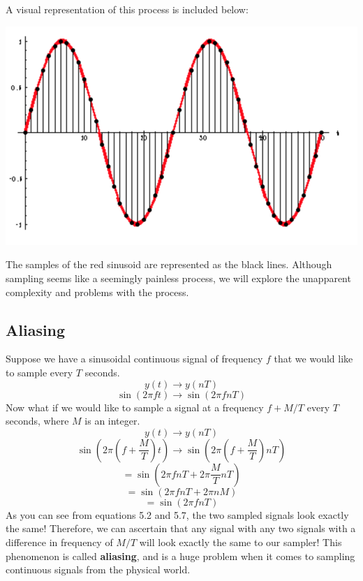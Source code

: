 \documentclass[a4paper]{article}
\numberwithin{equation}{section}
\begin{document}
A visual representation of this process is included below:
\begin{center}
\includegraphics[scale=0.7]{example_sample.png}
\end{center}
The samples of the red sinusoid are represented as the black lines.
Although sampling seems like a seemingly painless process, we will explore the unapparent complexity and problems with the process.

\subsection{Aliasing}
Suppose we have a sinusoidal continuous signal of frequency $f$ that we would like to sample every $T$ seconds. 
\begin{equation}
y(t) \rightarrow y(nT)
\end{equation}
\begin{equation}
\sin(2\pi f t) \rightarrow \sin(2\pi f nT)
\end{equation}
Now what if we would like to sample a signal at a frequency $f+M/T$ every $T$ seconds, where $M$ is an integer. 
\begin{equation}
y(t) \rightarrow y(nT)
\end{equation}
\begin{equation}
\sin(2\pi (f+\frac{M}{T}) t) \rightarrow \sin(2\pi (f+\frac{M}{T}) nT)
\end{equation}
\begin{equation}
= \sin(2\pi f nT+2\pi \frac{M}{T} nT)
\end{equation}
\begin{equation}
= \sin(2\pi f nT+2\pi nM)
\end{equation}
\begin{equation}
= \sin(2\pi f nT)
\end{equation}
As you can see from equations 5.2 and 5.7, the two sampled signals look exactly the same! Therefore, we can ascertain that any signal with any two signals with a difference in frequency of $M/T$ will look exactly the same to our sampler! This phenomenon is called \textbf{aliasing}, and is a huge problem when it comes to sampling continuous signals from the physical world.\\
\end{document}
